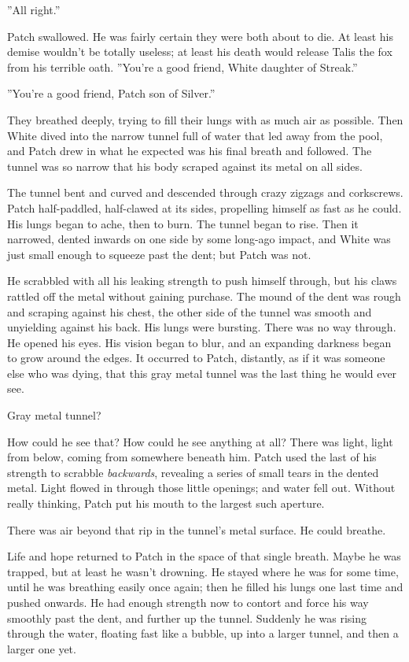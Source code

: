 \documentclass[12pt]{book}
\begin{document}
 ''All right.''\par
 Patch swallowed. He was fairly certain they were both about to die. At least his demise wouldn't be totally useless; at least his death would release Talis the fox from his terrible oath. ''You're a good friend, White daughter of Streak.''\par
 ''You're a good friend, Patch son of Silver.''\par
 They breathed deeply, trying to fill their lungs with as much air as possible. Then White dived into the narrow tunnel full of water that led away from the pool, and Patch drew in what he expected was his final breath and followed. The tunnel was so narrow that his body scraped against its metal on all sides.\par
 The tunnel bent and curved and descended through crazy zigzags and corkscrews. Patch half-paddled, half-clawed at its sides, propelling himself as fast as he could. His lungs began to ache, then to burn. The tunnel began to rise. Then it narrowed, dented inwards on one side by some long-ago impact, and White was just small enough to squeeze past the dent; but Patch was not.\par
 He scrabbled with all his leaking strength to push himself through, but his claws rattled off the metal without gaining purchase. The mound of the dent was rough and scraping against his chest, the other side of the tunnel was smooth and unyielding against his back. His lungs were bursting. There was no way through. He opened his eyes. His vision began to blur, and an expanding darkness began to grow around the edges. It occurred to Patch, distantly, as if it was someone else who was dying, that this gray metal tunnel was the last thing he would ever see.\par
 Gray metal tunnel?\par
 How could he see that? How could he see anything at all? There was light, light from below, coming from somewhere beneath him. Patch used the last of his strength to scrabble {\it backwards}, revealing a series of small tears in the dented metal. Light flowed in through those little openings; and water fell out. Without really thinking, Patch put his mouth to the largest such aperture.\par
There was air beyond that rip in the tunnel's metal surface. He could breathe.\par
 Life and hope returned to Patch in the space of that single breath. Maybe he was trapped, but at least he wasn't drowning. He stayed where he was for some time, until he was breathing easily once again; then he filled his lungs one last time and pushed onwards. He had enough strength now to contort and force his way smoothly past the dent, and further up the tunnel. Suddenly he was rising through the water, floating fast like a bubble, up into a larger tunnel, and then a larger one yet.\par
\end{document}
